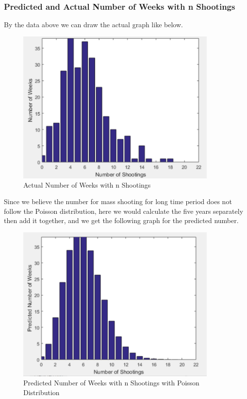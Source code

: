 \documentclass[12pt]{article}
\begin{document}
\subsubsection{Predicted and Actual Number of Weeks with n Shootings}

By the data above we can draw the actual graph like below.

\begin{figure}[H]
\begin{center}
\includegraphics[width=10cm]{actual.png}
\caption{Actual Number of Weeks with n Shootings}
\end{center}
\end{figure}

Since we believe the number for mass shooting for long time period does not follow the Poisson distribution, here we would calculate the five years separately then add it together, and we get the following graph for the predicted number.


\begin{figure}[H]
\begin{center}
\includegraphics[width=10cm]{Predicted.png}
\caption{Predicted Number of Weeks with n Shootings with Poisson Distribution}
\end{center}
\end{figure}
\end{document}
